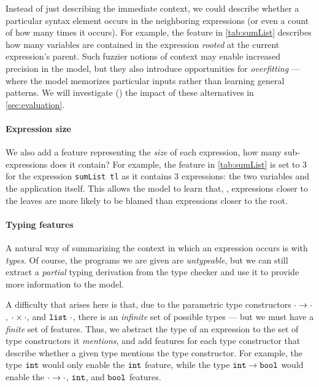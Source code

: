 Instead of just describing the immediate context, we could describe
whether a particular syntax element occurs in the neighboring
expressions (or even a count of how many times it occurs).
%
For example, the \CountVarP feature in \autoref{tab:sumList} describes
how many variables are contained in the expression \emph{rooted} at the
current expression's parent.
%
Such fuzzier notions of context may enable increased precision in the
model, but they also introduce opportunities for \emph{overfitting} ---
where the model memorizes particular inputs rather than learning general
patterns.
%
We will investigate () the impact of these alternatives
in \autoref{sec:evaluation}.

\paragraph{Expression size}
We also add a feature representing the \emph{size} of each expression,
\ie how many sub-expressions does it contain?
%
For example, the \ExprSize feature in \autoref{tab:sumList} is set to 3
for the expression \lstinline!sumList tl! as it contains 3 expressions:
the two variables and the application itself.
%
This allows the model to learn that, \eg, expressions closer to the
leaves are more likely to be blamed than expressions closer to the root.

\paragraph{Typing features}
A natural way of summarizing the context in which an expression occurs
is with \emph{types}.
%
Of course, the programs we are given are \emph{untypeable}, but we can
still extract a \emph{partial} typing derivation from the type checker
and use it to provide more information to the model.

A difficulty that arises here is that, due to the parametric type
constructors $\cdot \to \cdot$, $\cdot \times \cdot$, and
$\mathtt{list}\ \cdot$, there is an \emph{infinite} set of possible types ---
but we must have a \emph{finite} set of features.
%
Thus, we abstract the type of an expression to the set of type
constructors it \emph{mentions}, and add features for each type
constructor that describe whether a given type mentions the type
constructor.
%
For example, the type $\mathtt{int}$ would only enable the $\mathtt{int}$ feature,
while the type $\mathtt{int} \to \mathtt{bool}$ would enable the
$\cdot \to \cdot$, $\mathtt{int}$, and $\mathtt{bool}$ features.

